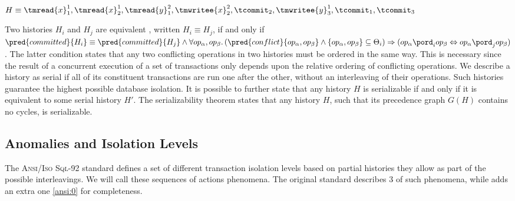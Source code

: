 \begin{center}
\\
$H \equiv \tmread{x}_1^1, \tmread{x}_2^1, \tmread{y}_1^2, \tmwritee{x}_2^2, \tcommit_2, \tmwritee{y}_3^1, \tcommit_1, \tcommit_3$
\end{center}

Two histories $H_i$ and $H_j$ are equivalent \cite{ccontrol}, written $H_i \equiv H_j$, if and only if $\pred{committed}{H_i} \equiv \pred{committed}{H_j} \land \forall op_\alpha, op_\beta \ldotp (\pred{conflict}{op_\alpha, op_\beta} \land \left\lbrace op_\alpha, op_\beta \right\rbrace \subseteq \Theta_i) \Rightarrow (op_\alpha \pord_i op_\beta \Leftrightarrow op_\alpha \pord_j op_\beta)$. The latter condition states that any two conflicting operations in two histories must be ordered in the same way. This is necessary since the result of a concurrent execution of a set of transactions only depends upon the relative ordering of conflicting operations. We describe a history as serial if all of its constituent transactions are run one after the other, without an interleaving of their operations. Such histories guarantee the highest possible database isolation. It is possible to further state that any history $H$ is serializable if and only if it is equivalent to some serial history $H'$. The serializability theorem \cite{ccontrol} states that any history $H$, such that its precedence graph $G(H)$ contains no cycles, is serializable.

\subsection{Anomalies and Isolation Levels}

The \textsc{Ansi/Iso Sql-92} standard \cite{ansi92} defines a set of different transaction isolation levels based on partial histories they allow as part of the possible interleavings. We will call these sequences of actions phenomena. The original standard describes 3 of such phenomena, while \cite{isolationansi} adds an extra one \ref{ansi:0} for completeness.

